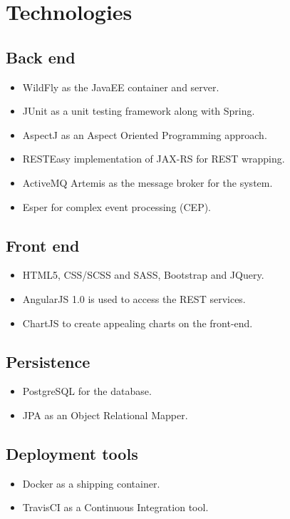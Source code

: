 \documentclass[11pt,a4paper]{article}
\begin{document}
\section{Technologies}
\subsection{Back end}
\begin{itemize}
	\item WildFly as the JavaEE container and server.
	\item JUnit as a unit testing framework along with Spring.
	\item AspectJ as an Aspect Oriented Programming approach.
	\item RESTEasy implementation of JAX-RS for REST wrapping.
	\item ActiveMQ Artemis as the message broker for the system.
	\item Esper for complex event processing (CEP).
\end{itemize}
\subsection{Front end}
\begin{itemize}
	\item HTML5, CSS/SCSS and SASS, Bootstrap and JQuery.
	\item AngularJS 1.0 is used to access the REST services.
	\item ChartJS to create appealing charts on the front-end.
\end{itemize}
\subsection{Persistence}
\begin{itemize}
	\item PostgreSQL for the database.
	\item JPA as an Object Relational Mapper.
\end{itemize}
\subsection{Deployment tools}
\begin{itemize}
	\item Docker as a shipping container.
	\item TravisCI as a Continuous Integration tool.
\end{itemize}
\end{document}
